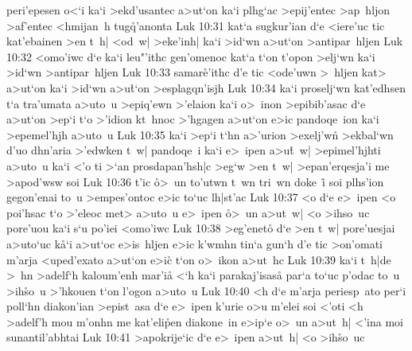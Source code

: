 peri'epesen
o<`i
ka`i
>ekd'usantec
a>ut`on
ka`i
plhg`ac
>epij'entec
>ap~hljon
>af'entec
<hmijan~h
tug\r{q}'anonta\bibvsend
{}
\vs Luk 10:31
kat`a
sugkur'ian
d`e
<iere'uc
tic
kat'ebainen
>en
t~h|
<od~w|
>eke'inh|
ka`i
>id`wn
a>ut`on
>antipar~hljen\bibvsend
\vs Luk 10:32
<omo'iwc
d`e
ka`i
leu"'ithc
gen'omenoc
kat`a
t`on
t'opon
>elj`wn
ka`i
>id`wn
>antipar~hljen\bibvsend
\vs Luk 10:33
samar\r{e}'ithc
d'e
tic
<ode'uwn
>~hljen
kat>
a>ut`on
ka`i
>id`wn
a>u\r{t}`on
>esplagqn'isjh\bibvsend
\vs Luk 10:34
ka`i
proselj`wn
kat'edhsen
t`a
tra'umata
a>uto~u
>epiq'ewn
>'elaion
ka`i
o>~inon
>epibib'asac
d`e
a>ut`on
>ep`i
t`o
>'idion
kt~hnoc
>'hgagen
a>ut`on
e>ic
pandoqe~ion
ka`i
>epemel'hjh
a>uto~u\bibvsend
\vs Luk 10:35
ka`i
>ep`i
t`hn
a>'urion
>exelj'wn\r{}
>ekbal`wn
d'uo
dhn'aria
>'edwken
t~w|
pandoqe~i
ka`i
e>~ipen
a>u\r{t}~w|
>epimel'hjhti
a>uto~u
ka`i
<'o
ti
>`an
prosdapan'hsh|c
>eg`w
>en
t~w|
>epan'erqesja'i
me
>apod'wsw
soi\bibvsend
\vs Luk 10:36
t'ic
\r{o}>~un
to'utwn
t~wn
tri~wn
doke~i\r{}
soi
plhs'ion
gegon'enai
to~u
>empes'ontoc
e>ic
to`uc
lh|st'ac\bibvsend
\vs Luk 10:37
<o
d`e
e>~ipen
<o
poi'hsac
t`o
>'eleoc
met>
a>uto~u
e>~ipen
\r{o}>~un
a>ut~w|
<o
>ihso~uc
pore'uou
ka`i
s`u
po'iei
<omo'iwc\bibvsend
\vs Luk 10:38
>eg'eneto\r{}
d`e
>en
t~w|
pore'uesjai
a>uto`uc
k\r{a}`i
a>ut`oc
e>is~hljen
e>ic
k'wmhn
tin`a
gun`h
d'e
tic
>on'omati
m'arja
<uped'exato
a>ut`on
e>ic\r{}
t`on
o>~ikon
a>ut~hc\bibvsend
\vs Luk 10:39
ka`i
t~h|de
>~hn
>adelf`h
kaloum'enh
mar'i\r{a}
<`h
ka`i
parakaj'isasa\r{}
par`a
to`uc
p'odac
to~u
>ih\r{s}o~u
>'hkouen
t`on
l'ogon
a>uto~u\bibvsend
\vs Luk 10:40
<h
d`e
m'arja
periesp~ato
per`i
poll`hn
diakon'ian
>epist~asa
d`e
e>~ipen
k'urie
o>u
m'elei
soi
<'oti
<h
>adelf'h
mou
m'onhn
me
kat'eli\r{p}en
diakone~in
e>ip`e
o>~un
a>ut~h|
<'ina
moi
sunantil'abhtai\bibvsend
\vs Luk 10:41
>apokrije`ic
d`e
e>~ipen
a>ut~h|
<o
>ih\r{s}o~uc
